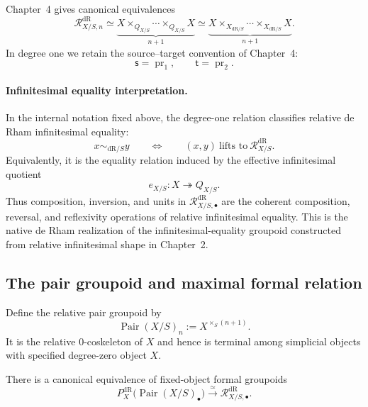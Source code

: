 Chapter~4 gives canonical equivalences
\[
    \mathcal R^{\mathrm{dR}}_{X/S,n}
    \simeq
    \underbrace{
    X\times_{Q_{X/S}}\cdots\times_{Q_{X/S}}X
    }_{n+1}
    \simeq
    \underbrace{
    X\times_{X_{\mathrm{dR}/S}}\cdots
      \times_{X_{\mathrm{dR}/S}}X
    }_{n+1}.
\]
In degree one we retain the source--target convention of Chapter~4:
\[
    \mathsf s=\operatorname{pr}_1,
    \qquad
    \mathsf t=\operatorname{pr}_2.
\]


\paragraph{Infinitesimal equality interpretation.}
In the internal notation fixed above, the degree-one relation classifies
relative de Rham infinitesimal equality:
\[
    x\sim_{\mathrm{dR}/S}y
    \qquad\Longleftrightarrow\qquad
    (x,y)\ \text{lifts to}\ \mathcal R^{\mathrm{dR}}_{X/S}.
\]
Equivalently, it is the equality relation induced by the effective
infinitesimal quotient
\[
    e_{X/S}:X\twoheadrightarrow Q_{X/S}.
\]
Thus composition, inversion, and units in
$\mathcal R^{\mathrm{dR}}_{X/S,\bullet}$ are the coherent composition, reversal, and
reflexivity operations of relative infinitesimal equality.  This is the
native de Rham realization of the infinitesimal-equality groupoid constructed
from relative infinitesimal shape in Chapter~2.

\subsection{The pair groupoid and maximal formal relation}

Define the relative pair groupoid by
\[
    \operatorname{Pair}(X/S)_n
    :=
    X^{\times_S(n+1)}.
\]
It is the relative $0$-coskeleton of $X$ and hence is terminal among
simplicial objects with specified degree-zero object $X$.

\begin{theorem}
\label{thm:pair-groupoid-formalization}
There is a canonical equivalence of fixed-object formal groupoids
\[
    P_X^{\mathrm{dR}}\bigl(\operatorname{Pair}(X/S)_\bullet\bigr)
    \xrightarrow{\simeq}
    \mathcal R^{\mathrm{dR}}_{X/S,\bullet}.
\]
\end{theorem}

